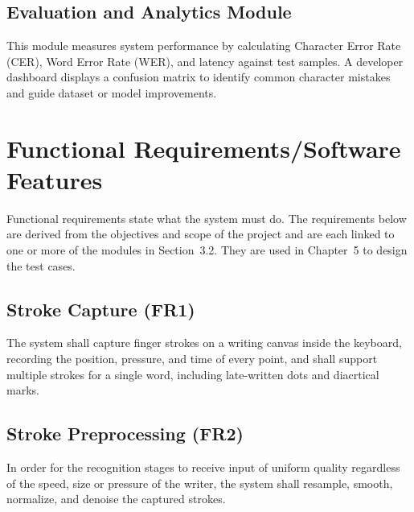 \documentclass[12pt,a4paper]{report}
\begin{document}
\subsection{Evaluation and Analytics Module}
This module measures system performance by calculating Character Error Rate (CER), Word Error Rate (WER), and latency against test samples. A developer dashboard displays a confusion matrix to identify common character mistakes and guide dataset or model improvements.

\section{Functional Requirements/Software Features}
Functional requirements state what the system must do. The requirements below are derived from the objectives and scope of the project and are each linked to one or more of the modules in Section~3.2. They are used in Chapter~5 to design the test cases.

\subsection{Stroke Capture (FR1)}
The system shall capture finger strokes on a writing canvas inside the keyboard, recording the position, pressure, and time of every point, and shall support multiple strokes for a single word, including late-written dots and diacrtical marks.

\subsection{Stroke Preprocessing (FR2)}
In order for the recognition stages to receive input of uniform quality regardless of the speed, size or pressure of the writer, the system shall resample, smooth, normalize, and denoise the captured strokes.
\end{document}
